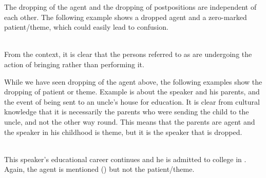 The dropping of the agent and the dropping of postpositions are independent of each other. The following example shows a dropped agent and a zero-marked patient/theme, which could easily lead to confusion.

 \\

From the context, it is clear that the persons referred to as  are undergoing the action of bringing rather than performing it.

While we have seen dropping of the agent above, the following examples show the dropping of patient or theme. Example  is about the speaker and his parents, and the event of being sent to an uncle's house for education. It is clear from cultural knowledge that it is necessarily the parents who were sending the child to the uncle, and not the other way round. This means that the parents are agent and the speaker in his childhood is theme, but it is the speaker that is dropped.

 \\

This speaker's educational career continues and he is admitted to college in . Again, the agent is mentioned () but not the patient/theme.

 \\

